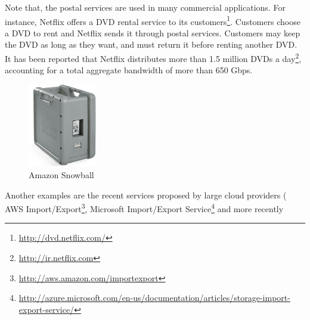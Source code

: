 Note that, the postal services are used in many commercial applications. For instance, Netflix offers a DVD rental service to its customers\footnote{\url{http://dvd.netflix.com/}}. Customers choose a DVD to rent and Netflix sends it through postal services. Customers may keep the DVD as long as they want, and must return it before renting another DVD. It has been reported that Netflix distributes more than 1.5 million DVDs a day\footnote{\url{ http://ir.netflix.com}}, accounting for a total aggregate bandwidth of more than 650 Gbps. 
\begin{figure}
    \centering
    \includegraphics[width=3cm]{figures/Snowball.png}
    \caption{Amazon Snowball}
    \label{fig:snowball}
\end{figure}
Another examples are the recent services proposed by large cloud providers (\eg 
AWS Import/Export\footnote{\url{http://aws.amazon.com/importexport}}, 
Microsoft Import/Export Service\footnote{\url{http://azure.microsoft.com/en-us/documentation/articles/storage-import-export-service/}} and more recently 
